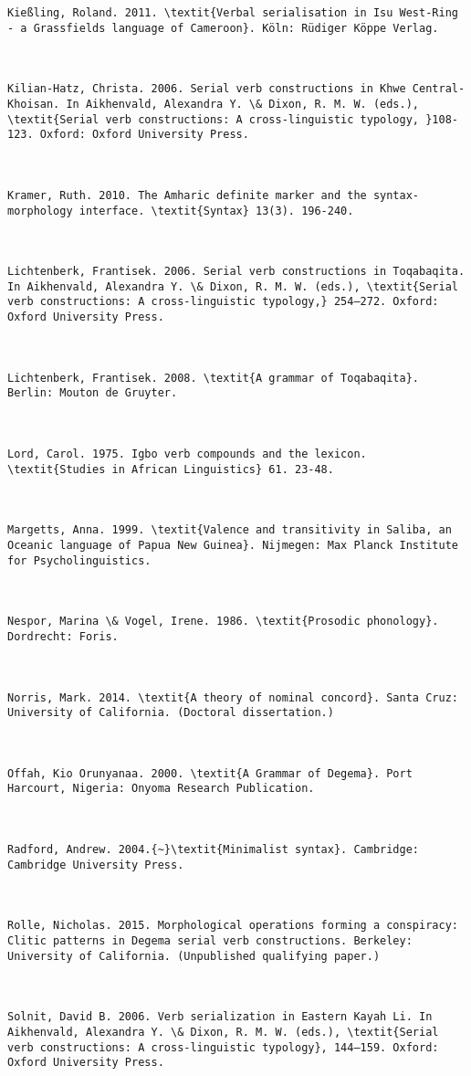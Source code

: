 \documentclass[output=paper]{langsci/langscibook}
\begin{document}
\begin{verbatim}
Kießling, Roland. 2011. \textit{Verbal serialisation in Isu West-Ring - a Grassfields language of Cameroon}. Köln: Rüdiger Köppe Verlag.



Kilian-Hatz, Christa. 2006. Serial verb constructions in Khwe Central-Khoisan. In Aikhenvald, Alexandra Y. \& Dixon, R. M. W. (eds.), \textit{Serial verb constructions: A cross-linguistic typology, }108-123. Oxford: Oxford University Press.



Kramer, Ruth. 2010. The Amharic definite marker and the syntax-morphology interface. \textit{Syntax} 13(3). 196-240.



Lichtenberk, Frantisek. 2006. Serial verb constructions in Toqabaqita. In Aikhenvald, Alexandra Y. \& Dixon, R. M. W. (eds.), \textit{Serial verb constructions: A cross-linguistic typology,} 254–272. Oxford: Oxford University Press.



Lichtenberk, Frantisek. 2008. \textit{A grammar of Toqabaqita}. Berlin: Mouton de Gruyter. 



Lord, Carol. 1975. Igbo verb compounds and the lexicon. \textit{Studies in African Linguistics} 61. 23-48.



Margetts, Anna. 1999. \textit{Valence and transitivity in Saliba, an Oceanic language of Papua New Guinea}. Nijmegen: Max Planck Institute for Psycholinguistics.



Nespor, Marina \& Vogel, Irene. 1986. \textit{Prosodic phonology}. Dordrecht: Foris.



Norris, Mark. 2014. \textit{A theory of nominal concord}. Santa Cruz: University of California. (Doctoral dissertation.)



Offah, Kio Orunyanaa. 2000. \textit{A Grammar of Degema}. Port Harcourt, Nigeria: Onyoma Research Publication.



Radford, Andrew. 2004.{~}\textit{Minimalist syntax}. Cambridge: Cambridge University Press.



Rolle, Nicholas. 2015. Morphological operations forming a conspiracy: Clitic patterns in Degema serial verb constructions. Berkeley: University of California. (Unpublished qualifying paper.)



Solnit, David B. 2006. Verb serialization in Eastern Kayah Li. In Aikhenvald, Alexandra Y. \& Dixon, R. M. W. (eds.), \textit{Serial verb constructions: A cross-linguistic typology}, 144–159. Oxford: Oxford University Press.



\end{verbatim}
 
\printbibliography[heading=subbibliography,notkeyword=this]
\end{document}
